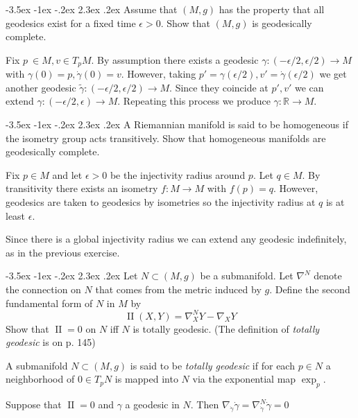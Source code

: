 \documentclass[10pt]{article}
\makeatletter
\renewcommand\section{\@startsection{section}{1}{\z@}%
                                  {-3.5ex \@plus -1ex \@minus -.2ex}%
                                  {2.3ex \@plus.2ex}%
                                  {\normalfont\large\bfseries}}
\newcommand{\R}{\ensuremath{\mathbb{R}}}
\DeclareMathOperator{\2}{II}
\makeatother
\begin{document}

\section{Assume that $(M,g)$ has the property that all geodesics exist for a fixed time $\epsilon > 0$. Show that $(M,g)$ is geodesically complete.}

Fix $p\ \in M, v \in T_p M$. By assumption there exists a geodesic $\gamma : (- \epsilon/2 , \epsilon / 2 ) \to M$ with $\gamma(0) = p, \dot{\gamma}(0) = v$. However, taking $p' = \gamma(\epsilon/2 ), v' = \dot{\gamma} ( \epsilon / 2)$ we get another geodesic $\tilde{\gamma} :  (- \epsilon/2 , \epsilon / 2 ) \to M$. Since they coincide at $p', v'$ we can extend $\gamma : (-\epsilon / 2 , \epsilon) \to M$. Repeating this process we produce $\gamma : \R \to M$.

\section{A Riemannian manifold is said to be homogeneous if the isometry group acts transitively. Show that homogeneous manifolds are geodesically complete.}

Fix $p \in M$ and let $\epsilon > 0 $ be the injectivity radius around $p$. 
Let $q \in M$. By transitivity there exists an isometry $f : M \to M $ with $f(p) = q$. However, geodesics are taken to geodesics by isometries so the injectivity radius at $q$ is at least $\epsilon$.

Since there is a global injectivity radius we can extend any geodesic indefinitely, as in the previous exercise.

\section{Let $N \subset (M,g)$ be a submanifold. Let $\nabla^N$ denote the connection on $N$ that comes from the metric induced by $g$. Define the second fundamental form of $N$ in $M$ by $$\2(X,Y) = \nabla_X^N Y - \nabla_X Y$$ Show that $\2 =0$ on $N$ iff $N$ is totally geodesic. (The definition of \emph{totally geodesic} is on p. 145)}

A submanifold $N \subset (M,g)$  is said to be \emph{totally geodesic} if for each $p \in N$ a neighborhood of $0 \in T_p N$ is mapped into $N$ via the exponential map $\exp_p$.

Suppose that $\2 =0$ and $\gamma$ a geodesic in $N$. Then $\nabla_{\dot{\gamma}} \dot{\gamma} = \nabla^N_{\dot{\gamma}} \dot{\gamma} =0$
\end{document}
